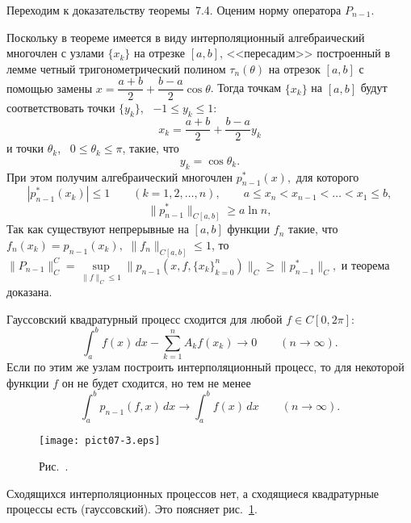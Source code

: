 Переходим к доказательству теоремы~7.4. Оценим норму оператора
$P_{n-1}.$

Поскольку в теореме имеется в виду интерполяционный алгебраический многочлен
с узлами $\{x_k\}$ на отрезке $[a,b]$, <<пересадим>> построенный в
лемме четный тригонометрический полином {$\tau_n(\theta)$} на
отрезок $[a,b]$ {с помощью замены $x=\dfrac{a+b}{2}+\dfrac{b-a}{2}\cos
\theta$}. Тогда точкам $\{x_k\}$ на $[a,b]$ будут соответствовать
точки $\{ y_k\}$,~ $-1\le y_k\le 1$:
$$
x_k=\frac{a+b}{2}+\frac{b-a}{2} y_k
$$
и точки $\theta_k$,~ $0\le \theta_k\le \pi$, {такие, что}
$$
y_k=\cos \theta_k.
$$
При этом получим алгебраический многочлен $p_{n-1}^*(x),$
для которого
$$
{|p_{n-1}^*(x_k)|\le 1 \qquad (k=1,2,\ldots,n), \qquad a\le x_n<x_{n-1}<\ldots<x_1\le b,}
$$
$$
\|p_{n-1}^*\|_{C[a,b]}\ge a\ln n,
$$
Так как существуют непрерывные на
$[a,b]$ функции $f_n$ такие, что $f_n(x_k)=p_{n-1}(x_k),$
{$\|f_n\|_{C[a,b]}\le 1$, то $\|P_{n-1}\|_C^C=\sup\limits_{\|f\|_C\le
1}\|p_{n-1}(x,f,\{x_k\}_{k=0}^n)\|_C\ge \|p_{n-1}^*\|_C,$} и теорема доказана.

\begin{Remark}
Гауссовский квадратурный процесс сходится для любой {$f\in C[0, 2\pi]$}:
$$
\int_a^b f(x)\, dx-\sum\limits_{k=1}^n A_kf(x_k) \to 0\qquad (n\to \infty).
$$
Если по этим же узлам построить интерполяционный процесс, то для некоторой
функции $f$ он не будет сходится, но тем не менее
$$
\int_a^b p_{n-1} (f,x)\, dx \to \int_a^b f(x)\, dx \qquad (n\to \infty).
$$




\begin{figure}[ht]
\begin{center}
\texttt{[image: pict07-3.eps]}
\end{center}
 \bigskip
 \label{r7-3}

 \centerline{Рис.~\theris. }
 \bigskip
\end{figure}



Сходящихся интерполяционных процессов нет, а сходящиеся квадратурные процессы
есть (гауссовский). Это поясняет рис.~\ref{r7-3}.
\end{Remark}
